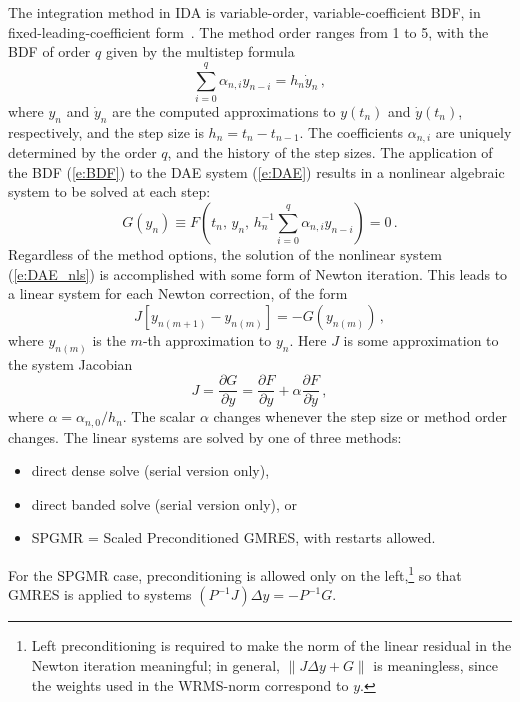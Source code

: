 The integration method in IDA is variable-order, variable-coefficient
BDF, in fixed-leading-coefficient form~\cite{BCP:96}.
The method order ranges from 1 to 5, with the BDF of order $q$
given by the multistep formula
\begin{equation}\label{e:BDF}
  \sum_{i=0}^q \alpha_{n,i}y_{n-i} = h_n {\dot y}_n \, ,
\end{equation}
where $y_n$ and ${\dot y}_n$ are the computed approximations to $y(t_n)$
and ${\dot y}(t_n)$, respectively, and the step size is $h_n = t_n - t_{n-1}$.  
The coefficients $\alpha_{n,i}$ are uniquely determined by the order
$q$, and the history of the step sizes.  The application of the BDF
(\ref{e:BDF}) to the DAE system (\ref{e:DAE}) results in a nonlinear
algebraic system to be solved at each step:
\begin{equation}\label{e:DAE_nls}
  G(y_n) \equiv 
  F \left( t_n , \, y_n , \, 
    h_n^{-1} \sum_{i=0}^q \alpha_{n,i}y_{n-i} \right) = 0 \, .
\end{equation}
%
Regardless of the method options, the solution of the nonlinear system
(\ref{e:DAE_nls}) is accomplished with some form of Newton iteration.
This leads to a linear system for each Newton correction, of the form
\begin{equation}\label{e:DAE_Newtoncorr}
  J [y_{n(m+1)} - y_{n(m)}] = -G(y_{n(m)})  \, , 
\end{equation}
where $y_{n(m)}$ is the $m$-th approximation to $y_n$. 
%
Here $J$ is some approximation to the system Jacobian
\begin{equation}\label{e:DAE_Jacobian}
  J = \frac{\partial G}{\partial y}
  = \frac{\partial F}{\partial y} + 
  \alpha\frac{\partial F}{\partial {\dot y}} \, ,
\end{equation}
where $\alpha = \alpha_{n,0}/h_n$.  The scalar $\alpha$ changes 
whenever the step size or method order changes.
%
The linear systems are solved by one of three methods:
\begin{itemize}
\item direct dense solve (serial version only),
\item direct banded solve (serial version only), or
\item SPGMR = Scaled Preconditioned GMRES, with restarts allowed.
\end{itemize}
For the SPGMR case, preconditioning is allowed only on the
left,\footnote{Left preconditioning is required to make the norm of
the linear residual in the Newton iteration meaningful; in general,
$\| J \Delta y + G \|$ is meaningless, since the weights used in 
the WRMS-norm correspond to $y$.}
so that GMRES is applied to systems $(P^{-1}J)\Delta y = -P^{-1}G$. 

